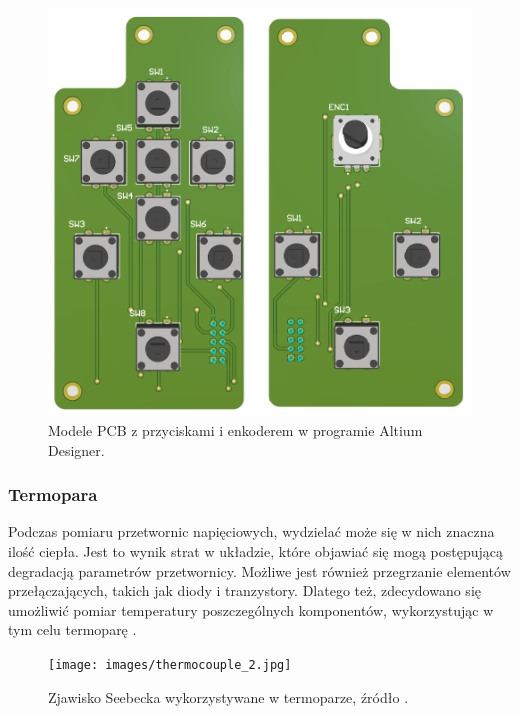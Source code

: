 \begin{figure}[h!]
    \begin{center}
        \includegraphics[width = 13cm]{images/modele_przyciskow.png}
        \caption{Modele PCB z przyciskami i enkoderem w programie Altium Designer.}
        \label{fig:modeleprzyciskow}
    \end{center}
\end{figure}




\subsubsection{Termopara}

Podczas pomiaru przetwornic napięciowych, wydzielać może się w nich znaczna ilość ciepła. Jest to wynik strat w układzie, które objawiać się mogą postępującą degradacją 
parametrów przetwornicy. Możliwe jest również przegrzanie elementów przełączających, takich jak diody i tranzystory. Dlatego też, 
zdecydowano się umożliwić pomiar temperatury poszczególnych komponentów, wykorzystując w tym celu termoparę \cite{termopara}.

\begin{figure}[h!]
    \begin{center}
        \texttt{[image: images/thermocouple\_2.jpg]}
        \caption{Zjawisko Seebecka wykorzystywane w termoparze, źródło \cite{termoparaSeebeck}.}
        \label{fig:thermocouple}
    \end{center}
\end{figure}

